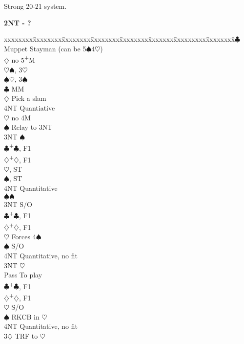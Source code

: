 \documentclass[10pt]{article}
\renewcommand{\c}{$\clubsuit$}
\renewcommand{\d}{$\diamondsuit$}
\newcommand{\h}{$\heartsuit$}
\newcommand{\s}{$\spadesuit$}
\newcommand{\p}{\textsuperscript{+}}
\newcommand{\m}{\textsuperscript{\textminus}}
\newenvironment{bidtable}[1][]
{\textbf{#1}
  \begin{adjustwidth}{1em}{}
    \addvspace{2pt}
    \begin{tabbing}
      xxxxxxxx\=xxxxxxxx\=xxxxxxxx\=xxxxxxxx\=xxxxxxxx\=xxxxxxx\=xxxxxxxxx\=xxxxxxxx\=\kill}
{\end{tabbing}\end{adjustwidth}\bigskip}%
\begin{document}
Strong 20-21 system.

\begin{bidtable}[2NT - ?]
3\c \> Muppet Stayman (can be 5\s 4\h)                     \\
    \d \> no 5\p M                    \\
    \>     \h {}\s, 3\m\h           \\
    \>     \s {}\h, 3\m\s           \\
    \>     \c {} MM                \\
    \>     \d \> Pick a slam          \\
    \>     \> 4NT \> Quantiative          \\
    \h \> no 4M                       \\
    \>     \s \> Relay to 3NT            \\
    \>     \> 3NT \s            \\
    \>     \c {}\p\c, F1            \\
    \>     \d {}\p\d, F1            \\
    \>     \h {}, ST\\
    \>     \s {}, ST           \\
    \>     \> 4NT \> Quantitative \\
    \s {}\s                         \\
    \>     \> 3NT \> S/O            \\
    \>     \c {}\p\c, F1            \\
    \>     \d {}\p\d, F1            \\
    \>     \h \> Forces 4\s                  \\
    \>     \s \> S/O           \\
    \>     \> 4NT \> Quantitative, no fit \\
    \> 3NT \h                         \\
    \>     \> Pass \> To play           \\
    \>     \c {}\p\c, F1            \\
    \>     \d {}\p\d, F1            \\
    \>     \h \> S/O                  \\
    \>     \s \> RKCB in \h           \\
    \>     \> 4NT \> Quantitative, no fit \\
3\d \> TRF to \h                          \\

\end{bidtable}
\end{document}
